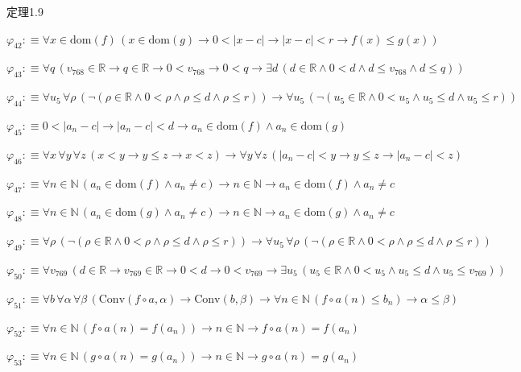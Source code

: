 \begin{fullproof}{定理1.9}
\begin{abbrevlist}
\item $\varphi_{42} :\equiv \forall x \in \mathrm{dom}(f)\,(x \in \mathrm{dom}(g) \to 0 < \lvert x - c \rvert \to \lvert x - c \rvert < r \to f(x) \leq g(x))$
\item $\varphi_{43} :\equiv \forall q\,(v_{768} \in \mathbb{R} \to q \in \mathbb{R} \to 0 < v_{768} \to 0 < q \to \exists d\,(d \in \mathbb{R} \land 0 < d \land d \leq v_{768} \land d \leq q))$
\item $\varphi_{44} :\equiv \forall u_{5}\,\forall \rho\,(\neg (\rho \in \mathbb{R} \land 0 < \rho \land \rho \leq d \land \rho \leq r)) \to \forall u_{5}\,(\neg (u_{5} \in \mathbb{R} \land 0 < u_{5} \land u_{5} \leq d \land u_{5} \leq r))$
\item $\varphi_{45} :\equiv 0 < \lvert a_{n} - c \rvert \to \lvert a_{n} - c \rvert < d \to a_{n} \in \mathrm{dom}(f) \land a_{n} \in \mathrm{dom}(g)$
\item $\varphi_{46} :\equiv \forall x\,\forall y\,\forall z\,(x < y \to y \leq z \to x < z) \to \forall y\,\forall z\,(\lvert a_{n} - c \rvert < y \to y \leq z \to \lvert a_{n} - c \rvert < z)$
\item $\varphi_{47} :\equiv \forall n \in \mathbb{N}\,(a_{n} \in \mathrm{dom}(f) \land a_{n} \neq c) \to n \in \mathbb{N} \to a_{n} \in \mathrm{dom}(f) \land a_{n} \neq c$
\item $\varphi_{48} :\equiv \forall n \in \mathbb{N}\,(a_{n} \in \mathrm{dom}(g) \land a_{n} \neq c) \to n \in \mathbb{N} \to a_{n} \in \mathrm{dom}(g) \land a_{n} \neq c$
\item $\varphi_{49} :\equiv \forall \rho\,(\neg (\rho \in \mathbb{R} \land 0 < \rho \land \rho \leq d \land \rho \leq r)) \to \forall u_{5}\,\forall \rho\,(\neg (\rho \in \mathbb{R} \land 0 < \rho \land \rho \leq d \land \rho \leq r))$
\item $\varphi_{50} :\equiv \forall v_{769}\,(d \in \mathbb{R} \to v_{769} \in \mathbb{R} \to 0 < d \to 0 < v_{769} \to \exists u_{5}\,(u_{5} \in \mathbb{R} \land 0 < u_{5} \land u_{5} \leq d \land u_{5} \leq v_{769}))$
\item $\varphi_{51} :\equiv \forall b\,\forall \alpha\,\forall \beta\,(\mathrm{Conv}(f \circ a,\alpha) \to \mathrm{Conv}(b,\beta) \to \forall n \in \mathbb{N}\,(f \circ a(n) \leq b_{n}) \to \alpha \leq \beta)$
\item $\varphi_{52} :\equiv \forall n \in \mathbb{N}\,(f \circ a(n) = f(a_{n})) \to n \in \mathbb{N} \to f \circ a(n) = f(a_{n})$
\item $\varphi_{53} :\equiv \forall n \in \mathbb{N}\,(g \circ a(n) = g(a_{n})) \to n \in \mathbb{N} \to g \circ a(n) = g(a_{n})$

\end{abbrevlist}
\end{fullproof}
